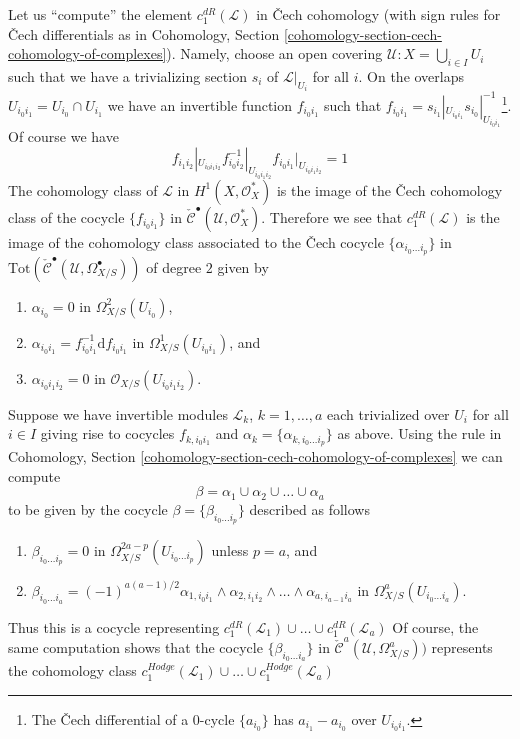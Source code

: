 \noindent
Let us ``compute'' the element $c^{dR}_1(\mathcal{L})$ in {\v C}ech
cohomology (with sign rules for {\v C}ech differentials
as in Cohomology, Section
\ref{cohomology-section-cech-cohomology-of-complexes}).
Namely, choose an open covering
$\mathcal{U} : X = \bigcup_{i \in I} U_i$ such that
we have a trivializing section $s_i$ of $\mathcal{L}|_{U_i}$ for all $i$.
On the overlaps $U_{i_0i_1} = U_{i_0} \cap U_{i_1}$
we have an invertible function $f_{i_0i_1}$ such that
$f_{i_0i_1} = s_{i_1}|_{U_{i_0i_1}} s_{i_0}|_{U_{i_0i_1}}^{-1}$\footnote{The
{\v C}ech differential of a $0$-cycle $\{a_{i_0}\}$ has
$a_{i_1} - a_{i_0}$ over $U_{i_0i_1}$.}.
Of course we have
$$
f_{i_1i_2}|_{U_{i_0i_1i_2}}
f_{i_0i_2}^{-1}|_{U_{i_0i_1i_2}}
f_{i_0i_1}|_{U_{i_0i_1i_2}} = 1
$$
The cohomology class of $\mathcal{L}$ in $H^1(X, \mathcal{O}_X^*)$ is
the image of the {\v C}ech cohomology class of the cocycle $\{f_{i_0i_1}\}$ in
$\check{\mathcal{C}}^\bullet(\mathcal{U}, \mathcal{O}_X^*)$.
Therefore we see that $c_1^{dR}(\mathcal{L})$ is the image
of the cohomology class associated to the {\v C}ech cocycle
$\{\alpha_{i_0 \ldots i_p}\}$ in
$\text{Tot}(\check{\mathcal{C}}^\bullet(\mathcal{U}, \Omega_{X/S}^\bullet))$
of degree $2$ given by
\begin{enumerate}
\item $\alpha_{i_0} = 0$ in $\Omega^2_{X/S}(U_{i_0})$,
\item $\alpha_{i_0i_1} = f_{i_0i_1}^{-1}\text{d}f_{i_0i_1}$ in
$\Omega^1_{X/S}(U_{i_0i_1})$, and
\item $\alpha_{i_0i_1i_2} = 0$ in $\mathcal{O}_{X/S}(U_{i_0i_1i_2})$.
\end{enumerate}
Suppose we have invertible modules $\mathcal{L}_k$, $k = 1, \ldots, a$
each trivialized over $U_i$ for all $i \in I$ giving rise to cocycles
$f_{k, i_0i_1}$ and $\alpha_k = \{\alpha_{k, i_0 \ldots i_p}\}$ as above.
Using the rule in
Cohomology, Section \ref{cohomology-section-cech-cohomology-of-complexes}
we can compute
$$
\beta = \alpha_1 \cup \alpha_2 \cup \ldots \cup \alpha_a
$$
to be given by the cocycle $\beta = \{\beta_{i_0 \ldots i_p}\}$
described as follows
\begin{enumerate}
\item $\beta_{i_0 \ldots i_p} = 0$ in
$\Omega^{2a - p}_{X/S}(U_{i_0 \ldots i_p})$ unless $p = a$, and
\item $\beta_{i_0 \ldots i_a} = (-1)^{a(a - 1)/2}
\alpha_{1, i_0i_1} \wedge \alpha_{2, i_1 i_2} \wedge \ldots \wedge
\alpha_{a, i_{a - 1}i_a}$ in
$\Omega^a_{X/S}(U_{i_0 \ldots i_a})$.
\end{enumerate}
Thus this is a cocycle representing
$c_1^{dR}(\mathcal{L}_1) \cup \ldots \cup c_1^{dR}(\mathcal{L}_a)$
Of course, the same computation shows that the cocycle
$\{\beta_{i_0 \ldots i_a}\}$ in
$\check{\mathcal{C}}^a(\mathcal{U}, \Omega_{X/S}^a))$
represents the cohomology class
$c_1^{Hodge}(\mathcal{L}_1) \cup \ldots \cup c_1^{Hodge}(\mathcal{L}_a)$


